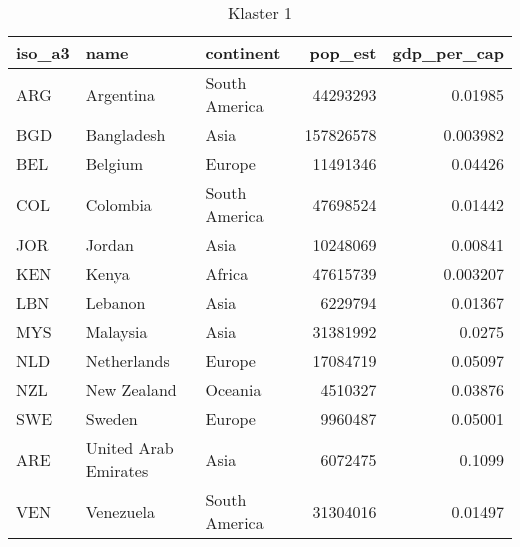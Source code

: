 \begin{table}[h!]
   \centering
   \caption{Klaster 1}
   \label{tab:cl1}
   \begin{tabular}{lllrr}
      \toprule
      iso\_a3 & name                 & continent     & pop\_est  & gdp\_per\_cap \\
      \midrule
      ARG     & Argentina            & South America & 44293293  & 0.01985       \\
      BGD     & Bangladesh           & Asia          & 157826578 & 0.003982      \\
      BEL     & Belgium              & Europe        & 11491346  & 0.04426       \\
      COL     & Colombia             & South America & 47698524  & 0.01442       \\
      JOR     & Jordan               & Asia          & 10248069  & 0.00841       \\
      KEN     & Kenya                & Africa        & 47615739  & 0.003207      \\
      LBN     & Lebanon              & Asia          & 6229794   & 0.01367       \\
      MYS     & Malaysia             & Asia          & 31381992  & 0.0275        \\
      NLD     & Netherlands          & Europe        & 17084719  & 0.05097       \\
      NZL     & New Zealand          & Oceania       & 4510327   & 0.03876       \\
      SWE     & Sweden               & Europe        & 9960487   & 0.05001       \\
      ARE     & United Arab Emirates & Asia          & 6072475   & 0.1099        \\
      VEN     & Venezuela            & South America & 31304016  & 0.01497       \\
      \bottomrule
   \end{tabular}
\end{table}
